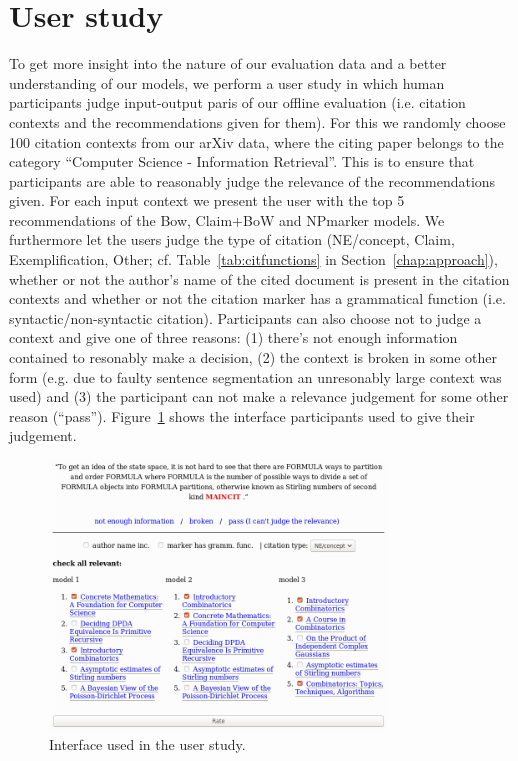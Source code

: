 \section{User study}\label{sec:oneval}
To get more insight into the nature of our evaluation data and a better understanding of our models, we perform a user study in which human participants judge input-output paris of our offline evaluation (i.e. citation contexts and the recommendations given for them). For this we randomly choose 100 citation contexts from our arXiv data, where the citing paper belongs to the category ``Computer Science - Information Retrieval''. This is to ensure that participants are able to reasonably judge the relevance of the recommendations given. For each input context we present the user with the top 5 recommendations of the Bow, Claim+BoW and NPmarker models. We furthermore let the users judge the type of citation (NE/concept, Claim, Exemplification, Other; cf. Table~\ref{tab:citfunctions} in Section~\ref{chap:approach}), whether or not the author's name of the cited document is present in the citation contexts and whether or not the citation marker has a grammatical function (i.e. syntactic/non-syntactic citation). Participants can also choose not to judge a context and give one of three reasons: (1) there's not enough information contained to resonably make a decision, (2) the context is broken in some other form (e.g. due to faulty sentence segmentation an unresonably large context was used) and (3) the participant can not make a relevance judgement for some other reason (``pass''). Figure~\ref{fig:interface} shows the interface participants used to give their judgement.


\begin{figure}[]
  \centering
    \includegraphics[width=0.8\textwidth]{figures/evaluation/interface.png}
  \caption{Interface used in the user study.}
  \label{fig:interface}
\end{figure}

